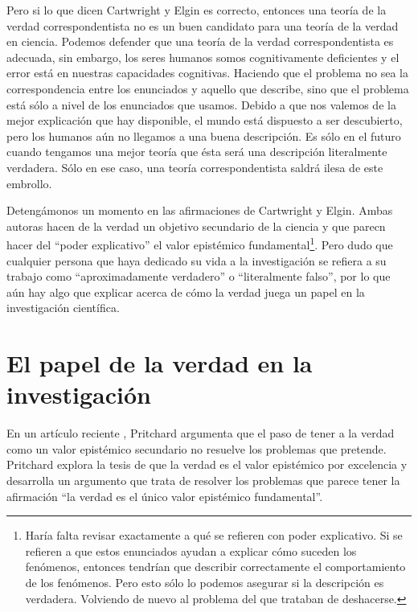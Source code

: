 Pero si lo que dicen Cartwright y Elgin es correcto, entonces una teoría de la verdad correspondentista no es un buen candidato para una teoría de la verdad en ciencia. Podemos defender que una teoría de la verdad correspondentista es adecuada, sin embargo, los seres humanos somos cognitivamente deficientes y el error está en nuestras capacidades cognitivas. Haciendo que el problema no sea la correspondencia entre los enunciados y aquello que describe, sino que el problema está sólo a nivel de los enunciados que usamos. Debido a que nos valemos de la mejor explicación que hay disponible, el mundo está dispuesto a ser descubierto, pero los humanos aún no llegamos a una buena descripción. Es sólo en el futuro cuando tengamos una mejor teoría que ésta será una descripción literalmente verdadera. Sólo en ese caso, una teoría correspondentista saldrá ilesa de este embrollo.

Detengámonos un momento en las afirmaciones de Cartwright y Elgin. Ambas autoras hacen de la verdad un objetivo secundario de la ciencia y que parecn hacer del ``poder explicativo'' el valor epistémico fundamental\footnote{Haría falta revisar exactamente a qué se refieren con poder explicativo. Si se refieren a que estos enunciados ayudan a explicar cómo suceden los fenómenos, entonces tendrían que describir correctamente el comportamiento de los fenómenos. Pero esto sólo lo podemos asegurar si la descripción es verdadera. Volviendo de nuevo al problema del que trataban de deshacerse.}. Pero dudo que cualquier persona que haya dedicado su vida a la investigación se refiera a su trabajo como ``aproximadamente verdadero'' o ``literalmente falso'', por lo que aún hay algo que explicar acerca de cómo la verdad juega un papel en la investigación científica.

\section{El papel de la verdad en la investigación}

\noindent En un artículo reciente \cite{Pritchard2019}, Pritchard argumenta que el paso de tener a la verdad como un valor epistémico secundario no resuelve los problemas que pretende. Pritchard explora la tesis de que la verdad es el valor epistémico por excelencia y desarrolla un argumento que trata de resolver los problemas que parece tener la afirmación ``la verdad es el único valor epistémico fundamental''.

